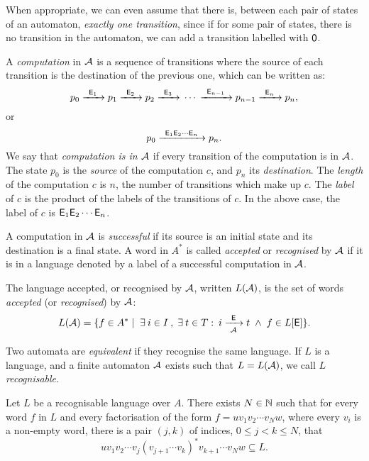 When appropriate, we can even assume that there is, between each pair of states of an automaton, \emph{exactly one transition}, since if for some pair of states, there is no transition in the automaton, we can add a transition labelled with ${\mathsf{0}}$.

A \emph{computation} in ${\mathcal{A}}$ is a sequence of transitions where the source of each transition is the destination of the previous one, which can be written as:
\[
    p_0 {\; \xrightarrow[]{\: \; {\mathsf{E}}_1 \: \;} \;} p_1 {\; \xrightarrow[]{\: \; {\mathsf{E}}_2 \: \;} \;} p_2 {\; \xrightarrow[]{\: \; {\mathsf{E}}_3 \: \;} \;} \dotsm {\; \xrightarrow[]{\: \; {\mathsf{E}}_{n-1} \: \;} \;} p_{n-1} {\; \xrightarrow[]{\: \; {\mathsf{E}}_n \: \;} \;} p_n,
\]
or
\[
    p_0 {\; \xrightarrow[]{\: \; {\mathsf{E}}_1 {\mathsf{E}}_2 \dotsm {\mathsf{E}}_n \: \;} \;} p_n.
\]
We say that \emph{computation is in ${\mathcal{A}}$} if every transition of the computation is in ${\mathcal{A}}$. The state $p_0$ is the \emph{source} of the computation $c$, and $p_n$ its \emph{destination}. The \emph{length} of the computation $c$ is $n$, the number of transitions which make up $c$. The \emph{label} of $c$ is the product of the labels of the transitions of $c$. In the above case, the label of $c$ is ${\mathsf{E}}_1 {\mathsf{E}}_2 \dotsm {\mathsf{E}}_n$.

A computation in ${\mathcal{A}}$ is \emph{successful} if its source is an initial state and its destination is a final state. A word in $A^*$ is called \emph{accepted} or \emph{recognised} by ${\mathcal{A}}$ if it is in a language denoted by a label of a successful computation in ${\mathcal{A}}$.

\begin{defn}
    The language accepted, or recognised by ${\mathcal{A}}$, written $L({\mathcal{A}})$, is the set of words \emph{accepted} (or \emph{recognised}) by ${\mathcal{A}}$:
    \[
        L({\mathcal{A}}) = \{ f \in A^* \mid \; \exists \: i \in I \: , \; \exists \: t \in T : \: i {\; \xrightarrow[{\mathcal{A}}]{\: \; {\mathsf{E}} \: \;} \;} t \; \wedge \; f \in L[{\mathsf{E}}] \}.
    \]
\end{defn}

Two automata are \emph{equivalent} if they recognise the same language. If $L$ is a language, and a finite automaton ${\mathcal{A}}$ exists such that $L = L({\mathcal{A}})$, we call $L$ \emph{recognisable}.

\begin{lemma}\label{lm:block_star_lemma}
    Let $L$ be a recognisable language over $A$. There exists $N \in \mathbb{N}$ such that for every word $f$ in $L$ and every factorisation of the form $f = u v_1 v_2 \dotsm v_N w$, where every $v_i$ is a non-empty word, there is a pair $(j,k)$ of indices, $0 \leq j < k \leq N$, that
    \[
        u v_1 v_2 \dotsm v_j {(v_{j+1} \dotsm v_k)}^* v_{k+1} \dotsm v_N w \subseteq L.
    \]
\end{lemma}

